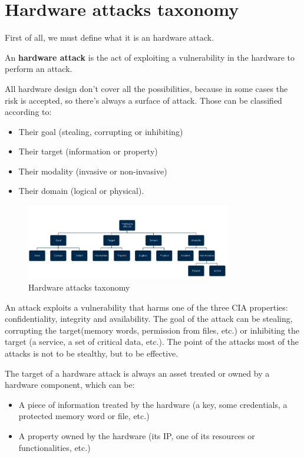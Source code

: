 \section{Hardware attacks taxonomy}
First of all, we must define what it is an hardware attack.
\begin{boxH}
  An \textbf{hardware attack} is the act of exploiting a vulnerability in the hardware to perform an
  attack.
\end{boxH}
All hardware design don't cover all the possibilities, because in some cases the risk is accepted,
so there's always a surface of attack. Those can be classified according to:
\begin{itemize}
  \item Their goal (stealing, corrupting or inhibiting)
  \item Their target (information or property)
  \item Their modality (invasive or non-invasive)
  \item Their domain (logical or physical).
\end{itemize}

\begin{figure}[H]
  \centering
  \includegraphics[width=0.8\textwidth]{img/hardware/hw attacks taxonomy.png}
  \caption{Hardware attacks taxonomy}
  \label{fig:hw-attacks-taxonomy}
\end{figure}

An attack exploits a vulnerability that harms one of the three CIA properties: confidentiality,
integrity and availability. The goal of the attack can be stealing, corrupting the target(memory
words, permission from files, etc.) or inhibiting the target (a service, a set of critical data, etc.).
The point of the attacks most of the attacks is not to be stealthy, but to be effective.

The target of a hardware attack is always an asset treated or owned by a hardware component, which
can be:
\begin{itemize}
  \item A piece of information treated by the hardware (a key, some credentials, a protected memory word
    or file, etc.)
  \item A property owned by the hardware (its IP, one of its resources or functionalities, etc.)
\end{itemize}

